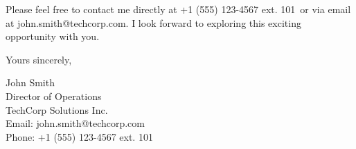 \documentclass[11pt]{article}
\makeatletter
\newcommand{\companyname}{TechCorp Solutions Inc.}
\newcommand{\companyfooter}{TechCorp Solutions Inc. | Reg. No. 123456789 | VAT No. GB123456789}
\newcommand{\sendername}{John Smith}
\newcommand{\sendertitle}{Director of Operations}
\newcommand{\senderemail}{john.smith@techcorp.com}
\newcommand{\senderphone}{+1 (555) 123-4567 ext. 101}
\makeatother
\begin{document}
Please feel free to contact me directly at \senderphone\ or via email at \senderemail. I look forward to exploring this exciting opportunity with you.

\vspace{1em}

\noindent
Yours sincerely,

\vspace{2em}


\noindent
\sendername \\
\sendertitle \\
\companyname \\
Email: \senderemail \\
Phone: \senderphone

\vspace{1em}



\vfill
{}
\end{document}
